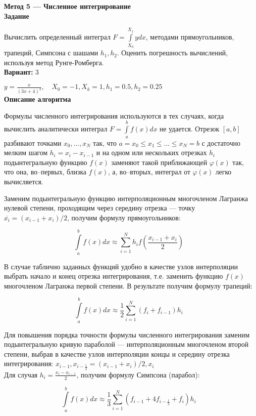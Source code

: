 \textbf{Метод 5 --- Численное интегрирование}\\

\textbf{Задание}

Вычислить определенный интеграл $F=\int\limits_{X_0}^{X_1}ydx$, методами прямоугольников, трапеций, Симпсона с шашами $h_1, h_2$. Оценить погрешность вычислений, используя метод Рунге-Ромберга.\\

\textbf{Вариант:} 3

$y=\frac{x}{(3x+4)^3}, \quad X_0=-1, X_k=1, h_1=0.5, h_2=0.25$\\

\textbf{Описание алгоритма}

Формулы численного интегрирования используются в тех случаях, когда вычислить аналитически интеграл $F=\int\limits_{a}^bf(x)dx$ не удается. Отрезок $[a, b]$ разбивают точками $x_0,...,x_N$ так, что $a=x_0 \leq x_1 \leq ... \leq x_N=b$ с достаточно мелким шагом $h_i=x_i-x_{i-1}$ и на одном или нескольких отрезках $h_i$ подынтегральную функцию $f(x)$ заменяют такой приближающей $\varphi(x)$ так, что она, во--первых, близка $f(x)$, а, во--вторых, интеграл от $\varphi(x)$ легко вычисляется.

Заменим подынтегральную функцию интерполяционным многочленом Лагранжа нулевой степени, проходящим через середину отрезка --- точку $\overline{x_i}=(x_{i-1}+x_i)/2$, получим формулу прямоугольников:

$$
\int\limits_{a}^bf(x)dx \approx \sum\limits_{i=1}^Nh_if(\frac{x_{i-1}+x_i}{2})
$$

В случае таблично заданных функций удобно в качестве узлов интерполяции выбрать начало и конец отрезка интегрирования, т.е. заменить функцию $f(x)$ многочленом Лагранжа первой степени. В результате получим формулу трапеций:

$$
\int\limits_{a}^bf(x)dx \approx \frac{1}{2}\sum\limits_{i=1}^N(f_i+f_{i-1})h_i
$$

Для повышения порядка точности формулы численного интегрирования заменим подынтегральную кривую параболой --- интерполяционным многочленом второй степени, выбрав в качестве узлов интерполяции концы и середину отрезка интегрирования: $x_{i-1}, x_{i-\frac{1}{2}}=(x_{i-1}+x_i)/2, x_i$\\

Для случая $h_i=\frac{x_i-x_{i-1}}{2}$, получим формулу Симпсона (парабол):

$$
\int\limits_{a}^bf(x)dx \approx \frac{1}{3}\sum\limits_{i=1}^N(f_{i-1}+4f_{i-\frac{1}{2}}+f_i)h_i
$$


